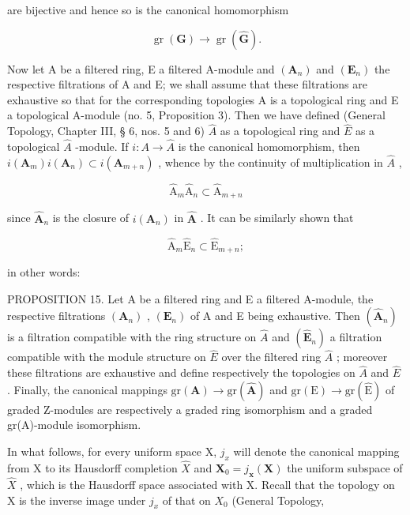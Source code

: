 are bijective and hence so is the canonical homomorphism

\[
\operatorname{gr} (\mathbf {G}) \rightarrow \operatorname{gr} (\hat {\mathbf {G}}).\tag{22}
\]

Now let A be a filtered ring, E a filtered A-module and \((\mathbf{A}_{n})\) and \((\mathbf{E}_{n})\) the respective filtrations of A and E; we shall assume that these filtrations are exhaustive so that for the corresponding topologies A is a topological ring and E a topological A-module (no. 5, Proposition 3). Then we have defined (General Topology, Chapter III, § 6, nos. 5 and 6) \(\hat{A}\) as a topological ring and \(\hat{E}\) as a topological \(\hat{A}\) -module. If \(i: A \to \hat{A}\) is the canonical homomorphism, then \(i(\mathbf{A}_{m})i(\mathbf{A}_{n}) \subset i(\mathbf{A}_{m+n})\) , whence by the continuity of multiplication in \(\hat{A}\) ,

\[
\hat {\mathrm{A}} _ {m} \hat {\mathrm{A}} _ {n} \subset \hat {\mathrm{A}} _ {m + n}\tag{23}
\]

since \(\hat{\mathbf{A}}_n\) is the closure of \(i(\mathbf{A}_n)\) in \(\hat{\mathbf{A}}\) . It can be similarly shown that

\[
\hat {\mathrm{A}} _ {m} \hat {\mathrm{E}} _ {n} \subset \hat {\mathrm{E}} _ {m + n};\tag{24}
\]

in other words:

PROPOSITION 15. Let A be a filtered ring and E a filtered A-module, the respective filtrations \((\mathbf{A}_{n})\) , \((\mathbf{E}_{n})\) of A and E being exhaustive. Then \((\hat{\mathbf{A}}_{n})\) is a filtration compatible with the ring structure on \(\hat{A}\) and \((\hat{\mathbf{E}}_{n})\) a filtration compatible with the module structure on \(\hat{E}\) over the filtered ring \(\hat{A}\) ; moreover these filtrations are exhaustive and define respectively the topologies on \(\hat{A}\) and \(\hat{E}\) . Finally, the canonical mappings \(\mathrm{gr}(\mathbf{A}) \to \mathrm{gr}(\hat{\mathbf{A}})\) and \(\mathrm{gr}(\mathrm{E}) \to \mathrm{gr}(\hat{\mathrm{E}})\) of graded Z-modules are respectively a graded ring isomorphism and a graded gr(A)-module isomorphism.

In what follows, for every uniform space X, \(j_{x}\) will denote the canonical mapping from X to its Hausdorff completion \(\hat{X}\) and \(\mathbf{X}_{0}=j_{\mathbf{x}}(\mathbf{X})\) the uniform subspace of \(\hat{X}\) , which is the Hausdorff space associated with X. Recall that the topology on X is the inverse image under \(j_{x}\) of that on \(X_{0}\) (General Topology,

